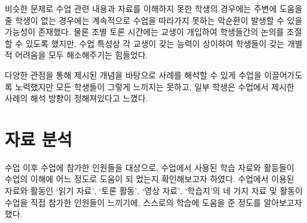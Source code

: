 \documentclass[10pt, a4paper, chapter]{oblivoir}
\begin{document}
    비슷한 문제로 수업 관련 내용과 자료를 이해하지 못한 학생의 경우에는 주변에 도움을 줄 학생이 없는 경우에는 계속적으로 수업을 따라가지 못하는 악순환이 발생할 수 있을 가능성이 존재했다. 
    물론 조별 토론 시간에는 교생이 개입하여 학생들간의 논의를 조절할 수 있도록 했지만, 수업 특성상 각 교생이 갖는 능력이 상이하여 학생들이 갖는 개별적 어려움을 모두 해소해주기는 힘들었다. 

    다양한 관점을 통해 제시된 개념을 바탕으로 사례를 해석할 수 있게 수업을 이끌어가도록 노력했지만 모든 학생들이 그렇게 느끼지는 못하고, 일부 학생은 수업에서 제시한 사례의 해석 방향이 정해져있다고 느꼈다. 



\chapter{자료 분석}
수업 이후 수업에 참가한 인원들을 대상으로, 수업에서 사용된 학습 자료와 활등들이 수업의 이해에 어느 정도로 도움이 되 었는지 확인해보고자 하였다. 수업에서 이용된 자료와 활동인 `읽기 자료', `토론 활동', `영상 자료', `학습지'의 네 가지 자료 및 활동이 수업을 직접 참가한 인원들이 느끼기에, 스스로의 학습에 도움을 준 정도를 알아보고자 했다. 
\end{document}
